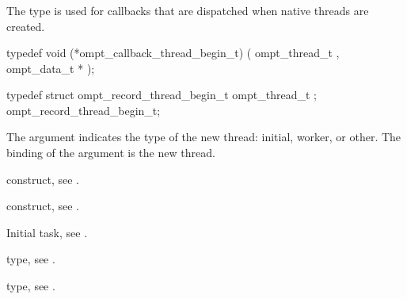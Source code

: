 \subsubsection{}
\label{sec:ompt_callback_thread_begin_t}

\summary
The  type is used for callbacks
that are dispatched when native threads are created.

\format
\begin{ccppspecific}
\begin{omptCallback}
typedef void (*ompt_callback_thread_begin_t) (
  ompt_thread_t ,
  ompt_data_t *
);
\end{omptCallback}
\end{ccppspecific}

\record
\begin{ccppspecific}
\begin{omptRecord}
typedef struct ompt_record_thread_begin_t {
  ompt_thread_t ;
} ompt_record_thread_begin_t;
\end{omptRecord}
\end{ccppspecific}

\argdesc
The  argument indicates the type of the new thread: initial, 
worker, or other. The binding of the  argument is the new thread.

\begin{crossrefs}
\item {} construct, see .

\item {} construct, see .

\item Initial task, see .

\item {} type, see .

\item {} type, see .
\end{crossrefs}



\subsubsection{}
\label{sec:ompt_callback_thread_end_t}

